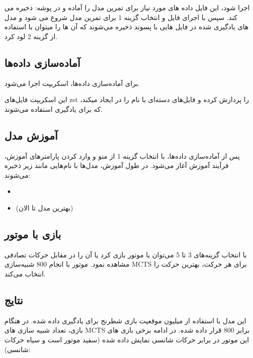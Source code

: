 \documentclass[12pt,a4paper]{article}
\begin{document}
اجرا شود، این فایل داده های مورد نیاز برای تمرین مدل را آماده و در پوشه:
ذخیره می کند.  سپس با اجرای فایل 
و انتخاب گزینه 1 برای  تمرین مدل شروع می شود و مدل های یادگیری شده در فایل هایی با پسوند 
ذخیره می‌شوند که آن ها را میتوان  با استفاده از گزینه 2 لود کرد.
	\subsection{آماده‌سازی داده‌ها}
	برای آماده‌سازی داده‌ها، اسکریپت  اجرا می‌شود.
	
	این اسکریپت فایل‌های zst را پردازش کرده و فایل‌های دسته‌ای با نام  را در ایجاد میکند، که برای یادگیری استفاده می‌شوند.
	
	\subsection{آموزش مدل}
	پس از آماده‌سازی داده‌ها، با انتخاب گزینه 1 از منو و وارد کردن پارامترهای آموزش، فرآیند آموزش آغاز می‌شود. در طول آموزش، مدل‌ها با نام‌هایی مانند زیر ذخیره می‌شوند:
	\begin{itemize}
		\item {} 
		\item {} (بهترین مدل تا الان)
	\end{itemize}
	
	\subsection{بازی با موتور}
	با انتخاب گزینه‌های 3 تا 5 می‌توان با موتور بازی کرد یا آن را در مقابل حرکات تصادفی مشاهده نمود. موتور با انجام 800 شبیه‌سازی MCTS برای هر حرکت، بهترین حرکت را انتخاب می‌کند.
	\subsection{نتایج}
	این مدل با استفاده از
	 میلیون موقعیت بازی شطرنج برای 
	 یادگیری داده شده. در هنگام بازی، تعداد شبیه سازی های MCTS برابر 800 قرار داده شده. در ادامه برخی بازی های این موتور در برابر حرکات شانسی نمایش داده شده (سفید موتور است و سیاه حرکات شانسی):
	 
\end{document}

